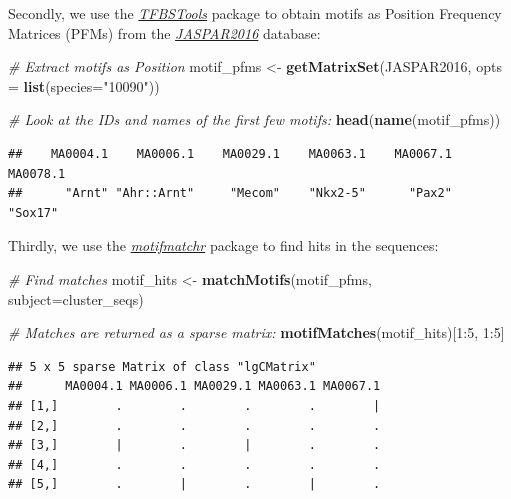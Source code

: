 \documentclass[9pt,a4paper,]{extarticle}
\newenvironment{Shaded}{\begin{snugshade}}{\end{snugshade}}
\newcommand{\KeywordTok}[1]{\textcolor[rgb]{0.13,0.29,0.53}{\textbf{{#1}}}}
\newcommand{\DataTypeTok}[1]{\textcolor[rgb]{0.13,0.29,0.53}{{#1}}}
\newcommand{\DecValTok}[1]{\textcolor[rgb]{0.00,0.00,0.81}{{#1}}}
\newcommand{\StringTok}[1]{\textcolor[rgb]{0.31,0.60,0.02}{{#1}}}
\newcommand{\CommentTok}[1]{\textcolor[rgb]{0.56,0.35,0.01}{\textit{{#1}}}}
\newcommand{\NormalTok}[1]{{#1}}
\begin{document}
Secondly, we use the \emph{\href{https://bioconductor.org/packages/3.8/TFBSTools}{TFBSTools}}\citep{Tan2016} package to obtain motifs as Position Frequency Matrices (PFMs) from the \emph{\href{https://bioconductor.org/packages/3.8/JASPAR2016}{JASPAR2016}} database:

\begin{Shaded}
\begin{Highlighting}[]
\CommentTok{# Extract motifs as Position}
\NormalTok{motif_pfms <-}\StringTok{ }\KeywordTok{getMatrixSet}\NormalTok{(JASPAR2016, }\DataTypeTok{opts =} \KeywordTok{list}\NormalTok{(}\DataTypeTok{species=}\StringTok{"10090"}\NormalTok{))}

\CommentTok{# Look at the IDs and names of the first few motifs:}
\KeywordTok{head}\NormalTok{(}\KeywordTok{name}\NormalTok{(motif_pfms))}
\end{Highlighting}
\end{Shaded}

\begin{verbatim}
##    MA0004.1    MA0006.1    MA0029.1    MA0063.1    MA0067.1    MA0078.1 
##      "Arnt" "Ahr::Arnt"     "Mecom"    "Nkx2-5"      "Pax2"     "Sox17"
\end{verbatim}

Thirdly, we use the \emph{\href{https://bioconductor.org/packages/3.8/motifmatchr}{motifmatchr}} package \citep{Schep2018} to find hits in the sequences:

\begin{Shaded}
\begin{Highlighting}[]
\CommentTok{# Find matches}
\NormalTok{motif_hits <-}\StringTok{ }\KeywordTok{matchMotifs}\NormalTok{(motif_pfms, }\DataTypeTok{subject=}\NormalTok{cluster_seqs)}

\CommentTok{# Matches are returned as a sparse matrix:}
\KeywordTok{motifMatches}\NormalTok{(motif_hits)[}\DecValTok{1}\NormalTok{:}\DecValTok{5}\NormalTok{, }\DecValTok{1}\NormalTok{:}\DecValTok{5}\NormalTok{]}
\end{Highlighting}
\end{Shaded}

\begin{verbatim}
## 5 x 5 sparse Matrix of class "lgCMatrix"
##      MA0004.1 MA0006.1 MA0029.1 MA0063.1 MA0067.1
## [1,]        .        .        .        .        |
## [2,]        .        .        .        .        .
## [3,]        |        .        |        .        .
## [4,]        .        .        .        .        .
## [5,]        .        |        .        |        .
\end{verbatim}
\end{document}
